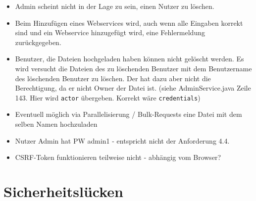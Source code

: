 \documentclass[12pt,DIV14,BCOR10mm,a4paper,parskip=half-,headsepline,headinclude,english,ngerman,bibliography=totocnumbered]{scrreprt}
\begin{document}
\begin{itemize} 
  
  \item Admin scheint nicht in der Lage zu sein, einen Nutzer zu löschen.
  \item Beim Hinzufügen eines Webservices wird, auch wenn alle Eingaben korrekt sind und ein Webservice hinzugefügt wird, eine Fehlermeldung zurückgegeben.
  
  \item Benutzer, die Dateien hochgeladen haben können nicht gelöscht werden. Es wird versucht die Dateien des zu löschenden Benutzer mit dem Benutzername des löschenden Benutzer zu löschen. Der hat dazu aber nicht die Berechtigung, da er nicht Owner der Datei ist. (siehe AdminService.java Zeile 143. Hier wird \texttt{actor} übergeben. Korrekt wäre \texttt{credentials})
  \item Eventuell möglich via Parallelisierung / Bulk-Requests eine Datei mit dem selben Namen hochzuladen
  \item Nutzer Admin hat PW admin1 - entspricht nicht der Anforderung 4.4.
  \item CSRF-Token funktionieren teilweise nicht - abhängig vom Browser?
\end{itemize}

\chapter{Sicherheitslücken}
\end{document}

